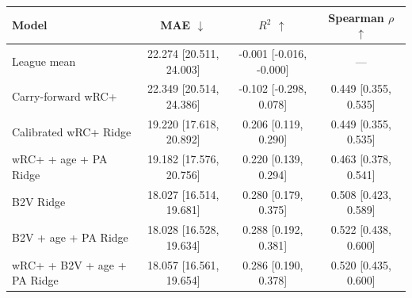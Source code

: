 \begin{tabular}{lccc}
\toprule
Model & MAE $\downarrow$ & $R^2$ $\uparrow$ & Spearman $\rho$ $\uparrow$ \\
\midrule
League mean & 22.274 [20.511, 24.003] & -0.001 [-0.016, -0.000] & --- \\
Carry-forward wRC+ & 22.349 [20.514, 24.386] & -0.102 [-0.298, 0.078] & 0.449 [0.355, 0.535] \\
Calibrated wRC+ Ridge & 19.220 [17.618, 20.892] & 0.206 [0.119, 0.290] & 0.449 [0.355, 0.535] \\
wRC+ + age + PA Ridge & 19.182 [17.576, 20.756] & 0.220 [0.139, 0.294] & 0.463 [0.378, 0.541] \\
B2V Ridge & 18.027 [16.514, 19.681] & 0.280 [0.179, 0.375] & 0.508 [0.423, 0.589] \\
B2V + age + PA Ridge & 18.028 [16.528, 19.634] & 0.288 [0.192, 0.381] & 0.522 [0.438, 0.600] \\
wRC+ + B2V + age + PA Ridge & 18.057 [16.561, 19.654] & 0.286 [0.190, 0.378] & 0.520 [0.435, 0.600] \\
\bottomrule
\end{tabular}
